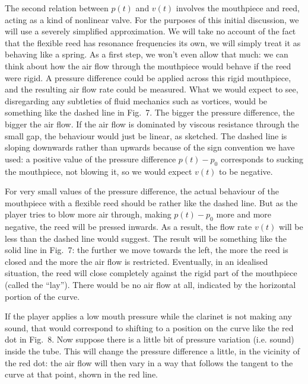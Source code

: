   The second relation between $p(t)$ and $v(t)$ involves the mouthpiece and 
  reed, acting as a kind of nonlinear valve. For the purposes of this initial 
  discussion, we will use a severely simplified approximation. We will take no 
  account of the fact that the flexible reed has resonance frequencies its own, 
  we will simply treat it as behaving like a spring. As a first step, we won’t 
  even allow that much: we can think about how the air flow through the 
  mouthpiece would behave if the reed were rigid. A pressure difference could 
  be applied across this rigid mouthpiece, and the resulting air flow rate 
  could be measured. What we would expect to see, disregarding any subtleties 
  of fluid mechanics such as vortices, would be something like the dashed line 
  in Fig.\ 7. The bigger the pressure difference, the bigger the air flow. If 
  the air flow is dominated by viscous resistance through the small gap, the 
  behaviour would just be linear, as sketched. The dashed line is sloping 
  downwards rather than upwards because of the sign convention we have used: a 
  positive value of the pressure difference $p(t)-p_0$ corresponds to sucking 
  the mouthpiece, not blowing it, so we would expect $v(t)$ to be negative. 


  For very small values of the pressure difference, the actual behaviour of the 
  mouthpiece with a flexible reed should be rather like the dashed line. But as 
  the player tries to blow more air through, making $p(t)-p_0$ more and more 
  negative, the reed will be pressed inwards. As a result, the flow rate $v(t)$ 
  will be less than the dashed line would suggest. The result will be something 
  like the solid line in Fig.\ 7: the further we move towards the left, the 
  more the reed is closed and the more the air flow is restricted. Eventually, 
  in an idealised situation, the reed will close completely against the rigid 
  part of the mouthpiece (called the “lay”). There would be no air flow at all, 
  indicated by the horizontal portion of the curve. 

  If the player applies a low mouth pressure while the clarinet is not making 
  any sound, that would correspond to shifting to a position on the curve like 
  the red dot in Fig.\ 8. Now suppose there is a little bit of pressure 
  variation (i.e. sound) inside the tube. This will change the pressure 
  difference a little, in the vicinity of the red dot: the air flow will then 
  vary in a way that follows the tangent to the curve at that point, shown in 
  the red line. 

